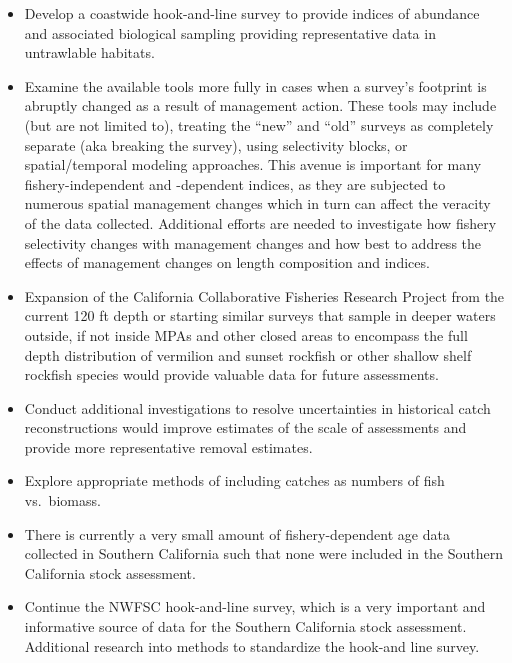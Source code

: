 \documentclass[11pt,
  english,
  a4paper,
]{article}
\begin{document}
\begin{itemize}
\item
  Develop a coastwide hook-and-line survey to provide indices of abundance and associated biological sampling providing representative data in untrawlable habitats.
\item
  Examine the available tools more fully in cases when a survey's footprint is abruptly changed as a result of management action. These tools may include (but are not limited to), treating the ``new'' and ``old'' surveys as completely separate (aka breaking the survey), using selectivity blocks, or spatial/temporal modeling approaches. This avenue is important for many fishery-independent and -dependent indices, as they are subjected to numerous spatial management changes which in turn can affect the veracity of the data collected. Additional efforts are needed to investigate how fishery selectivity changes with management changes and how best to address the effects of management changes on length composition and indices.
\item
  Expansion of the California Collaborative Fisheries Research Project from the current 120 ft depth or starting similar surveys that sample in deeper waters outside, if not inside MPAs and other closed areas to encompass the full depth distribution of vermilion and sunset rockfish or other shallow shelf rockfish species would provide valuable data for future assessments.
\item
  Conduct additional investigations to resolve uncertainties in historical catch reconstructions would improve estimates of the scale of assessments and provide more representative removal estimates.
\item
  Explore appropriate methods of including catches as numbers of fish vs.~biomass.
\item
  There is currently a very small amount of fishery-dependent age data collected in Southern California such that none were included in the Southern California stock assessment.
\item
  Continue the NWFSC hook-and-line survey, which is a very important and informative source of data for the Southern California stock assessment. Additional research into methods to standardize the hook-and line survey.
\end{itemize}

\tagstructend
\end{document}
